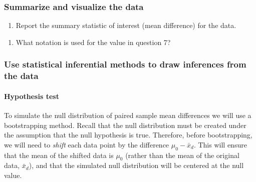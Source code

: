 \documentclass[
]{report}
\providecommand{\tightlist}{%
  \setlength{\itemsep}{0pt}\setlength{\parskip}{0pt}}
\begin{document}
\vspace{0.3in}

\hypertarget{summarize-and-visualize-the-data-3}{%
\subsubsection*{Summarize and visualize the data}\label{summarize-and-visualize-the-data-3}}

\begin{enumerate}
\def\labelenumi{\arabic{enumi}.}
\setcounter{enumi}{6}
\tightlist
\item
  Report the summary statistic of interest (mean difference) for the data.
\end{enumerate}

\vspace{0.3in}

\begin{enumerate}
\def\labelenumi{\arabic{enumi}.}
\setcounter{enumi}{7}
\tightlist
\item
  What notation is used for the value in question 7?
\end{enumerate}

\vspace{0.3in}

\hypertarget{use-statistical-inferential-methods-to-draw-inferences-from-the-data-1}{%
\subsubsection*{Use statistical inferential methods to draw inferences from the data}\label{use-statistical-inferential-methods-to-draw-inferences-from-the-data-1}}

\hypertarget{hypothesis-test}{%
\paragraph*{Hypothesis test}\label{hypothesis-test}}

To simulate the null distribution of paired sample mean differences we will use a bootstrapping method. Recall that the null distribution must be created under the assumption that the null hypothesis is true. Therefore, before bootstrapping, we will need to \emph{shift} each data point by the difference \(\mu_0 - \bar{x}_d\). This will ensure that the mean of the shifted data is \(\mu_0\) (rather than the mean of the original data, \(\bar{x}_d\)), and that the simulated null distribution will be centered at the null value.
\end{document}
